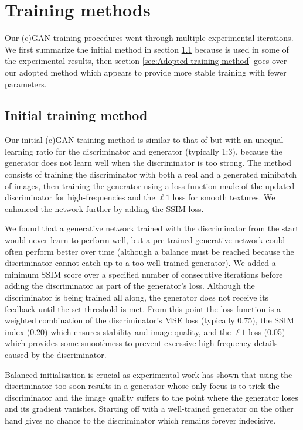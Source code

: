 \section{Training methods}

Our (c)GAN training procedures went through multiple experimental iterations. We first summarize the initial method in section \ref{sec:Initial training method} because is used in some of the experimental results, then section \ref{sec:Adopted training method} goes over our adopted method which appears to provide more stable training with fewer parameters.

\subsection{Initial training method}\label{sec:Initial training method}
Our initial (c)GAN training method is similar to that of \cite{pix2pix} but with an unequal learning ratio for the discriminator and generator (typically 1:3), because the generator does not learn well when the discriminator is too strong. The method consists of training the discriminator with both a real and a generated minibatch of images, then training the generator using a loss function made of the updated discriminator for high-frequencies and the $\ell 1$ loss for smooth textures. We enhanced the network further by adding the \ac{SSIM} loss.

We found that a generative network trained with the discriminator from the start would never learn to perform well, but a pre-trained generative network could often perform better over time (although a balance must be reached because the discriminator cannot catch up to a too well-trained generator). We added a minimum SSIM score over a specified number of consecutive iterations before adding the discriminator as part of the generator's loss. Although the discriminator is being trained all along, the generator does not receive its feedback until the set threshold is met. From this point the loss function is a weighted combination of the discriminator's \ac{MSE} loss (typically 0.75), the \ac{SSIM} index (0.20) which ensures stability and image quality, and the $\ell 1$ loss (0.05) which provides some smoothness to prevent excessive high-frequency details caused by the discriminator. 

Balanced initialization is crucial as experimental work has shown that using the discriminator too soon results in a generator whose only focus is to trick the discriminator and the image quality suffers to the point where the generator loses and its gradient vanishes. Starting off with a well-trained generator on the other hand gives no chance to the discriminator which remains forever indecisive.


